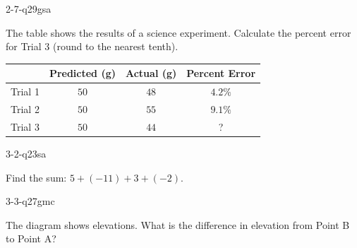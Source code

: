 \begin{practiceQuestion}{2-7-q29}{gsa}
\begin{questionText}
The table shows the results of a science experiment. Calculate the percent error for Trial 3 (round to the nearest tenth).

\begin{center}
\begin{tabular}{|l|c|c|c|}
\hline
 & \textbf{Predicted (g)} & \textbf{Actual (g)} & \textbf{Percent Error} \\
\hline
Trial 1 & $50$ & $48$ & $4.2\%$ \\
\hline
Trial 2 & $50$ & $55$ & $9.1\%$ \\
\hline
Trial 3 & $50$ & $44$ & ? \\
\hline
\end{tabular}
\end{center}
\end{questionText}
\end{practiceQuestion}

\begin{practiceQuestion}{3-2-q23}{sa}
\begin{questionText}
Find the sum: $5 + (-11) + 3 + (-2)$.
\end{questionText}
\end{practiceQuestion}

\begin{practiceQuestion}{3-3-q27}{gmc}
\begin{questionText}
The diagram shows elevations. What is the difference in elevation from Point B to Point A?

\begin{center}
\end{center}
\end{questionText}
\end{practiceQuestion}

